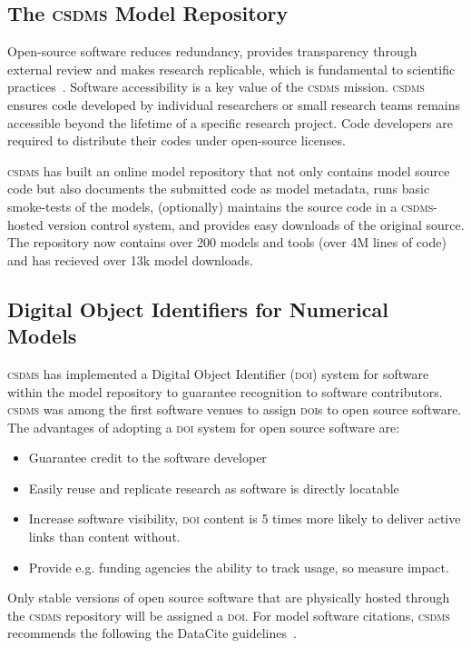 \documentclass[11pt, oneside]{amsart}
\DeclareRobustCommand{\csdms}{\textsc{csdms}}
\DeclareRobustCommand{\doi}{\textsc{doi}}
\begin{document}
\subsection{The \csdms{} Model Repository}
\label{sec:repository}

Open-source software reduces redundancy, provides transparency through
external review and makes research replicable, which is fundamental to
scientific practices~\cite{ince2012case}.
Software accessibility is a key value of the \csdms{} mission. \csdms{}
ensures code developed by individual researchers or small research teams
remains accessible beyond the lifetime of a specific research project. Code
developers are required to distribute their codes under open-source licenses. 

\csdms{} has built an online model repository that not only contains model
source code but also documents the submitted code as model metadata, runs
basic smoke-tests of the models, (optionally) maintains the source code in a
\csdms-hosted version control system, and provides easy downloads of the
original source. The repository now contains over 200 models and tools (over
4M lines of code) and has recieved over 13k model downloads.

\subsection{Digital Object Identifiers for Numerical Models}
\label{sec:doi}

\csdms{} has implemented a
Digital Object Identifier (\doi{}) system for software within the model
repository to guarantee recognition to software contributors.
\csdms{} was among the first software venues to assign \doi{}s to
open source software. The advantages of adopting a \doi{} system for open
source software are: 
\begin{itemize}
\item Guarantee credit to the software developer
\item Easily reuse and replicate research as software is directly locatable 
\item Increase software visibility, \doi{} content is 5 times more likely to
      deliver active links than content without.
\item Provide e.g. funding agencies the ability to track usage, so measure
      impact.
\end{itemize}

Only stable versions of open source
software that are physically hosted through the \csdms{} repository will be
assigned a \doi{}. For model software citations, \csdms{} recommends the
following the DataCite guidelines~\cite{brase2009datacite}.
\end{document}
